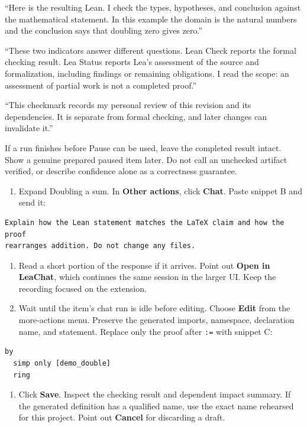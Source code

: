 ``Here is the resulting Lean. I check the types, hypotheses, and conclusion
against the mathematical statement. In this example the domain is the natural
numbers and the conclusion says that doubling zero gives zero.''

``These two indicators answer different questions. Lean Check reports the
formal checking result. Lea Status reports Lea's assessment of the source and
formalization, including findings or remaining obligations. I read the scope:
an assessment of partial work is not a completed proof.''

``This checkmark records my personal review of this revision and its
dependencies. It is separate from formal checking, and later changes can
invalidate it.''

\fallback
If a run finishes before Pause can be used, leave the completed result intact.
Show a genuine prepared paused item later. Do not call an unchecked artifact
verified, or describe confidence alone as a correctness guarantee.

\clearpage
{}

\click
\begin{enumerate}
  \item Expand Doubling a sum. In \textbf{Other actions}, click \textbf{Chat}.
    Paste snippet B and send it:
\end{enumerate}
\begin{lstlisting}
Explain how the Lean statement matches the LaTeX claim and how the proof
rearranges addition. Do not change any files.
\end{lstlisting}
\begin{enumerate}[resume]
  \item Read a short portion of the response if it arrives. Point out
    \textbf{Open in LeaChat}, which continues the same session in the larger UI.
    Keep the recording focused on the extension.
  \item Wait until the item's chat run is idle before editing. Choose
    \textbf{Edit} from the more-actions menu. Preserve the generated imports,
    namespace, declaration name, and statement. Replace only the proof after
    \texttt{:=} with snippet C:
\end{enumerate}
\begin{lstlisting}
by
  simp only [demo_double]
  ring
\end{lstlisting}
\begin{enumerate}[resume]
  \item Click \textbf{Save}. Inspect the checking result and dependent impact
    summary. If the generated definition has a qualified name, use the exact name
    rehearsed for this project. Point out \textbf{Cancel} for discarding a draft.
\end{enumerate}

